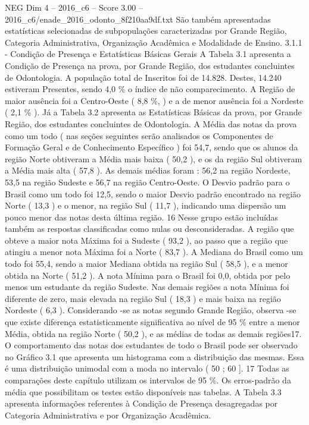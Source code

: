 \begin{textsample}{NEG Dim 4 – 2016\_c6 – Score 3.00 – 2016\_c6/enade\_2016\_odonto\_8f210aa9df.txt}
São também apresentadas estatísticas selecionadas de subpopulações caracterizadas por Grande Região, Categoria Administrativa, Organização Acadêmica e Modalidade de Ensino. 3.1.1 - Condição de Presença e Estatísticas Básicas Gerais A Tabela 3.1 apresenta a Condição de Presença na prova, por Grande Região, dos estudantes concluintes de Odontologia.
A população total de Inscritos foi de 14.828.
Destes, 14.240 estiveram Presentes, sendo 4,0 \% o índice de não comparecimento.
A Região de maior ausência foi a Centro-Oeste ( 8,8 \%, ) e a de menor ausência foi a Nordeste ( 2,1 \% ).
Já a Tabela 3.2 apresenta as Estatísticas Básicas da prova, por Grande Região, dos estudantes concluintes de Odontologia.
A Média das notas da prova como um todo ( nas seções seguintes serão analisados os Componentes de Formação Geral e de Conhecimento Específico ) foi 54,7, sendo que os alunos da região Norte obtiveram a Média mais baixa ( 50,2 ), e os da região Sul obtiveram a Média mais alta ( 57,8 ).
As demais médias foram : 56,2 na região Nordeste, 53,5 na região Sudeste e 56,7 na região Centro-Oeste.
O Desvio padrão para o Brasil como um todo foi 12,5, sendo o maior Desvio padrão encontrado na região Norte ( 13,3 ) e o menor, na região Sul ( 11,7 ), indicando uma dispersão um pouco menor das notas desta última região. 16 Nesse grupo estão incluídas também as respostas classificadas como nulas ou desconsideradas.
A região que obteve a maior nota Máxima foi a Sudeste ( 93,2 ), ao passo que a região que atingiu a menor nota Máxima foi a Norte ( 83,7 ).
A Mediana do Brasil como um todo foi 55,4, sendo a maior Mediana obtida na região Sul ( 58,5 ), e a menor obtida na Norte ( 51,2 ).
A nota Mínima para o Brasil foi 0,0, obtida por pelo menos um estudante da região Sudeste.
Nas demais regiões a nota Mínima foi diferente de zero, mais elevada na região Sul ( 18,3 ) e mais baixa na região Nordeste ( 6,3 ).
Considerando -se as notas segundo Grande Região, observa -se que existe diferença estatisticamente significativa ao nível de 95 \% entre a menor Média, obtida na região Norte ( 50,2 ), e as médias de todas as demais regiões17.
O comportamento das notas dos estudantes de todo o Brasil pode ser observado no Gráfico 3.1 que apresenta um histograma com a distribuição das mesmas.
Essa é uma distribuição unimodal com a moda no intervalo ( 50 ; 60 ]. 17 Todas as comparações deste capítulo utilizam os intervalos de 95 \%.
Os erros-padrão da média que possibilitam os testes estão disponíveis nas tabelas.
A Tabela 3.3 apresenta informações referentes à Condição de Presença desagregadas por Categoria Administrativa e por Organização Acadêmica.

\end{textsample}
